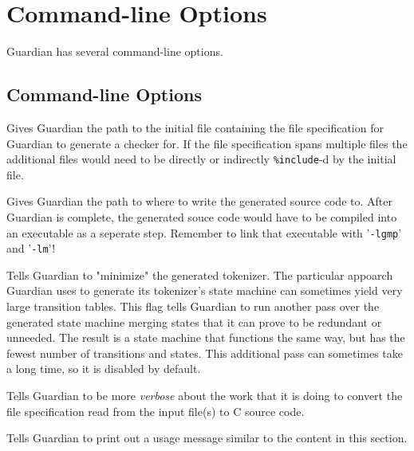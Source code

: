 
\chapter{Command-line Options}
{
	Guardian has several command-line options.
	
	\section{Command-line Options}
	{
		\begin{itemize}
		{
			\item [\texttt{-i <path>}]
			{
				Gives Guardian the path to the initial file containing the
				file specification for Guardian to generate a checker for.
				If the file specification spans multiple
				files the additional files would need to be
				directly or indirectly \texttt{\%include}-d by the initial file.
			}
			
			\item [\texttt{-o <path>}]
			{
				Gives Guardian the path to where to write the generated source
				code to. After Guardian is complete, the generated souce code
				would have to be compiled into an executable as a seperate step.
				Remember to link that executable with '\texttt{-lgmp}' and
				'\texttt{-lm}'!
			}
			
			\item [\texttt{-m}]
			{
				Tells Guardian to "minimize" the generated tokenizer. The
				particular appoarch Guardian uses to generate its tokenizer's
				state machine can sometimes yield very large transition tables.
				This flag tells Guardian to run another pass over the generated
				state machine merging states that it can prove to be redundant
				or unneeded. The result is a state machine that functions the
				same way, but has the fewest number of transitions and states.
				This additional pass can sometimes take a long time, so it is
				disabled by default.
			}
			
			\item [\texttt{-v}]
			{
				Tells Guardian to be more \textit{verbose} about the work that it
				is doing to convert the file specification read from the input
				file(s) to C source code.
			}
			
			\item [\texttt{-h}]
			{
				Tells Guardian to print out a usage message similar to the
				content in this section.
			}
		}
		\end{itemize}
	}
}





